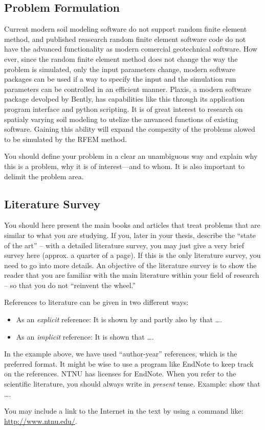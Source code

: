 \subsection*{Problem Formulation}
Current modern soil modeling software do not support random finite element method, and published reasearch random finite element software code do not have the advanced functionality as modern comercial geotechnical software.
How ever, since the random finite element method does not change the way the problem is simulated, only the input parameters change, modern software packages can be used if a way to specify the input and the simulation run parameters can be controlled in an efficient manner.
Plaxis, a modern software package devolped by Bently, has capabilities like this through its application program interface and python scripting. 
It is of great interest to research on spatialy varying soil modeling to utelize the anvanced functions of existing software. Gaining this ability will expand the compexity of the problems alowed to be simulated by the RFEM method.


You should define your problem in a clear an unambiguous way and explain why this is a problem, why it is of interest---and to whom. It is also important to delimit the problem area.
\subsection*{Literature Survey}
You should here present the main books and articles that treat problems that are similar to what  you are studying. If you,  later in your thesis, describe the ``state of the art'' -- with a detailed literature survey, you may just give a very brief survey here (approx. a quarter of a page). If this is the only literature survey, you need to go into more details. An objective of the literature survey is to show the reader that you are familiar with the main literature within your field of research -- so that you do not ``reinvent the wheel.''


References to literature can be given in two different ways:
\begin{itemize}
\item As an \emph{explicit} reference: It is shown by \citet{gri2010NUM} and partly also by \citet{Emd2007}  that \ldots.
\item As an \emph{implicit} reference: It is shown \citep[e.g., see][Chap. 4]{Deg2011Geo} that \ldots.
\end{itemize}
In the example above, we have used ``author-year'' references, which is the preferred format. It might be wise to use a program like EndNote to keep track on the references. NTNU has licenses for EndNote. When you refer to the scientific literature, you should always write in \emph{present} tense. Example: \citet{gri2010NUM} show that \ldots. 
\begin{remark}
 You may include a link to the Internet in the text by using a command like: \url{http://www.ntnu.edu/}.
\end{remark} 


